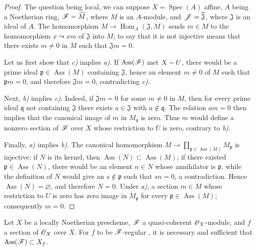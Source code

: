 \begin{proof}
The question being local, we can suppose $X=\operatorname{Spec}(A)$ affine, $A$ being a Noetherian ring, $\mathscr{F}=\widetilde{M}$, where $M$ is an $A$-module, and $\mathscr{J}=\widetilde{\mathfrak{J}}$, where $\mathfrak{J}$ is an ideal of $A$.
The homomorphism $M\to\operatorname{Hom}_A(\mathfrak{J},M)$ sends $m\in M$ to the homomorphism $x\leadsto xm$ of $\mathfrak{J}$ into $M$; to say that it is not injective means that there exists $m\neq 0$ in $M$ such that $\mathfrak{J} m=0$.

Let us first show that \emph{c)} implies \emph{a)}. If $\operatorname{Ass}(\mathscr{F})$ met $X- U$, there would be a prime ideal $\mathfrak{p}\in\operatorname{Ass}(M)$ containing $\mathfrak{J}$, hence an element $m\neq 0$ of $M$ such that $\mathfrak{p}m=0$, and therefore $\mathfrak{J}m=0$, contradicting \emph{c)}.

Next, \emph{b)} implies \emph{c)}. Indeed, if $\mathfrak{J}m=0$ for some $m\neq 0$ in $M$, then for every prime ideal $\mathfrak{q}$ not containing $\mathfrak{J}$ there exists $a\in\mathfrak{J}$ with $a\notin\mathfrak{q}$. The relation $am=0$ then implies that the canonical image of $m$ in $M_\mathfrak{q}$ is zero. Thus $m$ would define a nonzero section of $\mathscr{F}$ over $X$ whose restriction to $U$ is zero, contrary to \emph{b)}.

Finally, \emph{a)} implies \emph{b)}. The canonical homomorphism $M\longrightarrow\prod_{\mathfrak{p}\in\operatorname{Ass}(M)}M_\mathfrak{p}$
is injective: if $N$ is its kernel, then $\operatorname{Ass}(N)\subset\operatorname{Ass}(M)$; if there existed $\mathfrak{p}\in\operatorname{Ass}(N)$, there would be an element $n\in N$ whose annihilator is $\mathfrak{p}$, while the definition of $N$ would give an $s\notin\mathfrak{p}$ such that $sn=0$, a contradiction. Hence $\operatorname{Ass}(N)=\varnothing$, and therefore $N=0$. Under \emph{a)}, a section $m\in M$ whose restriction to $U$ is zero has zero image in $M_\mathfrak{p}$ for every $\mathfrak{p}\in\operatorname{Ass}(M)$; consequently $m=0$.
\end{proof}

\begin{corollary}[3.1.9]
\label{IV.3.1.9}
Let $X$ be a locally Noetherian prescheme, $\mathscr{F}$ a quasi-coherent $\mathscr{O}_X$-module, and $f$ a section of $\mathscr{O}_X$ over $X$.
For $f$ to be $\mathscr{F}$-regular , it is necessary and sufficient that $\operatorname{Ass}(\mathscr{F})\subset X_f$.
\end{corollary}

